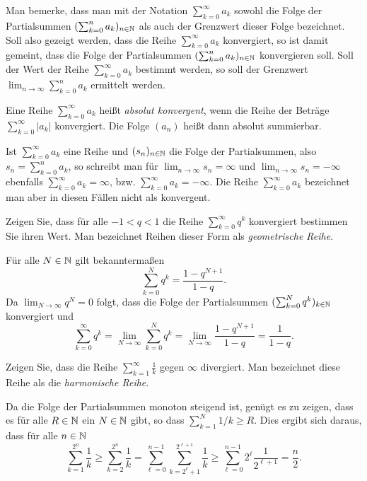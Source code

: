 \documentclass[a4paper,10pt]{article}
\begin{document}
Man bemerke, dass man mit der Notation $\sum_{k=0}^\infty a_k$ sowohl die Folge der Partialsummen $(\sum_{k=0}^n a_k)_{n \in \mathbb{N}}$ als auch der Grenzwert dieser Folge bezeichnet. Soll also gezeigt werden, dass die Reihe $\sum_{k=0}^\infty a_k$ konvergiert, so ist damit gemeint, dass die Folge der Partialsummen $(\sum_{k=0}^n a_k)_{n \in \mathbb{N}}$ konvergieren soll. Soll der Wert der Reihe $\sum_{k=0}^\infty a_k$ bestimmt werden, so soll der Grenzwert $\lim_{n \to \infty} \sum_{k=0}^n a_k$ ermittelt werden.


\begin{defi}
 Eine Reihe $\sum_{k=0}^\infty a_k$ heißt \emph{absolut konvergent}, wenn die Reihe der Beträge $\sum_{k=0}^\infty |a_k|$ konvergiert. Die Folge $(a_n)$ heißt dann absolut summierbar.
\end{defi}


\begin{bem}
 Ist $\sum_{k=0}^\infty a_k$ eine Reihe und $(s_n)_{n \in \mathbb{N}}$ die Folge der Partialsummen, also $s_n = \sum_{k=0}^n a_k$, so schreibt man für $\lim_{n \to \infty} s_n = \infty$ und $\lim_{n \to \infty} s_n = -\infty$ ebenfalls $\sum_{k=0}^\infty a_k = \infty$, bzw. $\sum_{k=0}^\infty a_k = -\infty$. Die Reihe $\sum_{k=0}^\infty a_k$ bezeichnet man aber in diesen Fällen nicht als konvergent.
\end{bem}


\begin{question}
 Zeigen Sie, dass für alle $-1 < q < 1$ die Reihe $\sum_{k=0}^\infty q^k$ konvergiert bestimmen Sie ihren Wert. Man bezeichnet Reihen dieser Form als \emph{geometrische Reihe}.
\end{question}
\begin{solution}
 Für alle $N \in \mathbb{N}$ gilt bekanntermaßen
 \[
  \sum_{k=0}^N q^k = \frac{1-q^{N+1}}{1-q}.
 \]
 Da $\lim_{N \to \infty} q^N = 0$ folgt, dass die Folge der Partialsummen $(\sum_{k=0}^N q^k)_{k \in \mathbb{N}}$ konvergiert und
 \[
  \sum_{k=0}^\infty q^k
  = \lim_{N \to \infty} \sum_{k=0}^N q^k
  = \lim_{N \to \infty} \frac{1-q^{N+1}}{1-q}
  = \frac{1}{1-q}.
 \]
\end{solution}


\begin{question}
 Zeigen Sie, dass die Reihe $\sum_{k=1}^\infty \frac{1}{k}$ gegen $\infty$ divergiert. Man bezeichnet diese Reihe als die \emph{harmonische Reihe}.
\end{question}
\begin{solution}
 Da die Folge der Partialsummen monoton steigend ist, genügt es zu zeigen, dass es für alle $R \in \mathbb{N}$ ein $N \in \mathbb{N}$ gibt, so dass $\sum_{k=1}^N 1/k \geq R$. Dies ergibt sich daraus, dass für alle $n \in \mathbb{N}$
 \[
  \sum_{k=1}^{2^n} \frac{1}{k}
  \geq \sum_{k=2}^{2^n} \frac{1}{k}
  = \sum_{\ell=0}^{n-1} \sum_{k=2^\ell+1}^{2^{\ell+1}} \frac{1}{k}
  \geq \sum_{\ell=0}^{n-1} 2^\ell \frac{1}{2^{\ell+1}}
  = \frac{n}{2}.
 \]
\end{solution}
\end{document}
